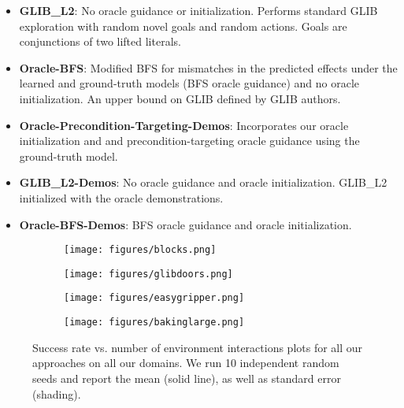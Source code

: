 \begin{itemize}
   \item \textbf{GLIB\_L2}: No oracle guidance or initialization. Performs standard GLIB exploration with random novel goals and random actions. Goals are conjunctions of two lifted literals.
      \item \textbf{Oracle-BFS}: Modified BFS for mismatches in the predicted effects under the learned and ground-truth models (BFS oracle guidance) and no oracle initialization. An upper bound on GLIB defined by GLIB authors.
    \item \textbf{Oracle-Precondition-Targeting-Demos}: Incorporates our oracle initialization and and precondition-targeting oracle guidance using the ground-truth model. 
    \item \textbf{GLIB\_L2-Demos}: No oracle guidance and oracle initialization. GLIB\_L2 initialized with the oracle demonstrations.
   \item \textbf{Oracle-BFS-Demos}: BFS oracle guidance and oracle initialization.
\end{itemize}

\begin{figure}[H]
    \centering
    \begin{subfigure}{0.22\textwidth}
        \centering
        \texttt{[image: figures/blocks.png]}
    \end{subfigure}
    \begin{subfigure}{0.22\textwidth}
        \centering
        \texttt{[image: figures/glibdoors.png]}
    \end{subfigure}
    \begin{subfigure}{0.22\textwidth}
        \centering
        \texttt{[image: figures/easygripper.png]}
    \end{subfigure}
    \begin{subfigure}{0.22\textwidth}
        \centering
            \texttt{[image: figures/bakinglarge.png]}
    \end{subfigure}
    \caption{Success rate vs. number of environment interactions plots for all our approaches on all our domains. We run 10 independent random seeds and report the mean (solid line), as well as standard error (shading).}
    \label{fig:row2}
\end{figure}

